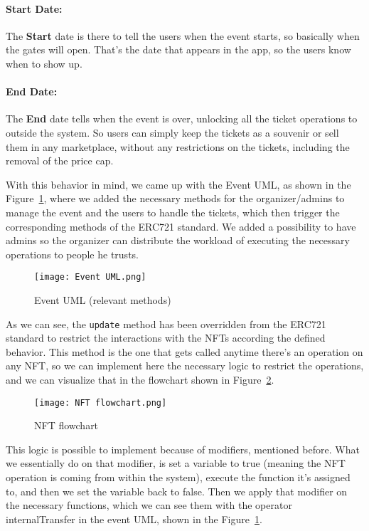 \paragraph{Start Date:} The \textbf{Start} date is there to tell the users when the event starts, so
basically when the gates will open. That's the date that appears in the app, so
the users know when to show up.

\paragraph{End Date:} The \textbf{End} date tells when the event is over, unlocking all the ticket
operations to outside the system. So users can simply keep the tickets as a
souvenir or sell them in any marketplace, without any restrictions on the
tickets, including the removal of the price cap.

With this behavior in mind, we came up with the Event UML, as shown in the
Figure~\ref{fig:event_uml}, where we added the necessary methods for the
organizer/admins to manage the event and the users to handle the tickets, which
then trigger the corresponding methods of the ERC721 standard. We added a
possibility to have admins so the organizer can distribute the workload of
executing the necessary operations to people he trusts.

\begin{figure}[H]
	\texttt{[image: Event UML.png]}
	\centering
	\caption{Event UML (relevant methods)}\label{fig:event_uml}
\end{figure}

As we can see, the \texttt{update} method has been overridden from the ERC721
standard to restrict the interactions with the NFTs according the defined
behavior. This method is the one that gets called anytime there's an operation
on any NFT, so we can implement here the necessary logic to restrict the
operations, and we can visualize that in the flowchart shown in
Figure~\ref{fig:nft_flowchart}.

\begin{figure}[H]
	\texttt{[image: NFT flowchart.png]}
	\centering
	\caption{NFT flowchart}\label{fig:nft_flowchart}
\end{figure}

This logic is possible to implement because of modifiers, mentioned before.
What we essentially do on that modifier, is set a variable to true (meaning the
NFT operation is coming from within the system), execute the function it's
assigned to, and then we set the variable back to false. Then we apply that
modifier on the necessary functions, which we can see them with the operator
	{internalTransfer} in the event UML, shown in the Figure~\ref{fig:event_uml}.

